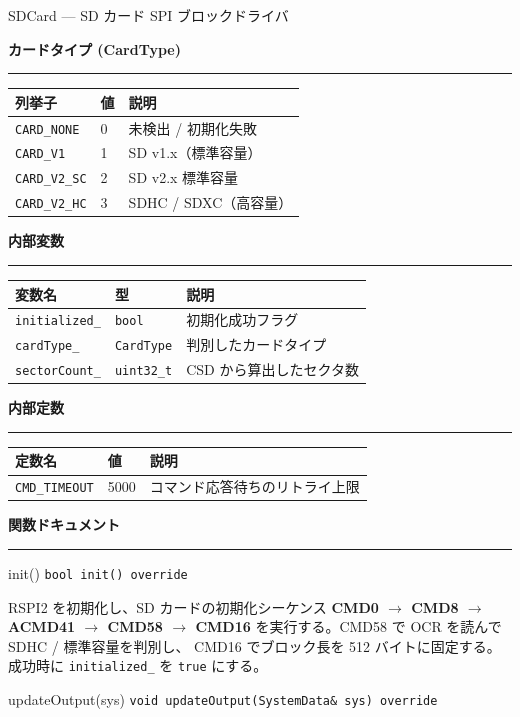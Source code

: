 \documentclass[a4paper,11pt,dvipdfmx]{jsarticle}
\makeatletter
\newcommand{\apisection}[1]{%
  \par\addvspace{4mm}%
  {\normalsize\bfseries\color{headerblue} #1}%
  \par\vspace{-1mm}%
  {\color{accentblue!40}\rule{\linewidth}{0.5pt}}%
  \par\nobreak\vspace{2mm}%
  \@afterheading
}
\makeatother
\begin{document}
\begin{apibox}{SDCard --- SD カード SPI ブロックドライバ}
\apisection{カードタイプ (CardType)}

\begin{tabularx}{\textwidth}{l l X}
\toprule
\textbf{列挙子} & \textbf{値} & \textbf{説明} \\
\midrule
\texttt{CARD\_NONE}   & 0 & 未検出 / 初期化失敗 \\
\texttt{CARD\_V1}     & 1 & SD v1.x（標準容量） \\
\texttt{CARD\_V2\_SC} & 2 & SD v2.x 標準容量 \\
\texttt{CARD\_V2\_HC} & 3 & SDHC / SDXC（高容量） \\
\bottomrule
\end{tabularx}

\apisection{内部変数}

\begin{tabularx}{\textwidth}{l l X}
\toprule
\textbf{変数名} & \textbf{型} & \textbf{説明} \\
\midrule
\texttt{initialized\_} & \texttt{bool}      & 初期化成功フラグ \\
\texttt{cardType\_}    & \texttt{CardType}  & 判別したカードタイプ \\
\texttt{sectorCount\_} & \texttt{uint32\_t} & CSD から算出したセクタ数 \\
\bottomrule
\end{tabularx}

\apisection{内部定数}

\begin{tabularx}{\textwidth}{l l X}
\toprule
\textbf{定数名} & \textbf{値} & \textbf{説明} \\
\midrule
\texttt{CMD\_TIMEOUT} & 5000 & コマンド応答待ちのリトライ上限 \\
\bottomrule
\end{tabularx}

\apisection{関数ドキュメント}

\begin{funcblock}{init()}
\texttt{bool init() override}

\vspace{1.5mm}
RSPI2 を初期化し、SD カードの初期化シーケンス
\textbf{CMD0 $\rightarrow$ CMD8 $\rightarrow$ ACMD41 $\rightarrow$ CMD58 $\rightarrow$ CMD16}
を実行する。CMD58 で OCR を読んで SDHC / 標準容量を判別し、
CMD16 でブロック長を 512 バイトに固定する。
成功時に \texttt{initialized\_} を \texttt{true} にする。
\end{funcblock}

\begin{funcblock}{updateOutput(sys)}
\texttt{void updateOutput(SystemData\& sys) override}


\end{funcblock}
\end{apibox}
\end{document}
